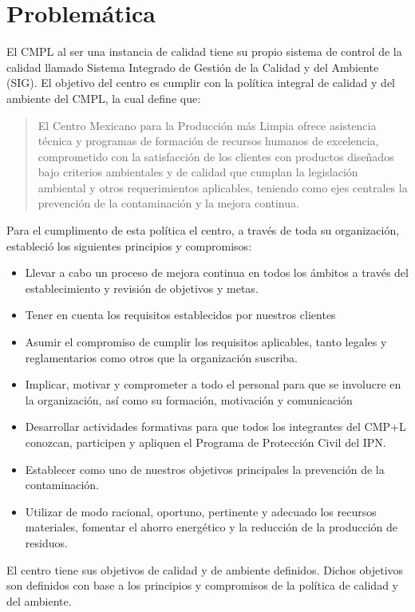 \section{Problemática}
El CMPL al ser una instancia de calidad tiene su propio sistema de control de la calidad llamado Sistema Integrado de Gestión de la Calidad y del Ambiente (SIG). El objetivo del centro es cumplir con la política integral de calidad y del ambiente del CMPL, la cual define que:

\begin{quote}
El Centro Mexicano para la Producción más Limpia ofrece asistencia técnica y programas de formación de recursos humanos de excelencia, comprometido con la satisfacción de los clientes con productos diseñados bajo criterios ambientales y de calidad  que cumplan la legislación ambiental y otros requerimientos  aplicables, teniendo como ejes centrales la prevención de la contaminación y la mejora continua.
\end{quote}

Para el cumplimento de esta política el centro, a través de toda su organización,  estableció los siguientes principios y compromisos:

\begin{itemize}
	\item	Llevar a cabo un proceso de mejora continua en todos los ámbitos a través del establecimiento y revisión de objetivos y metas.
	\item 	Tener en cuenta los requisitos establecidos por nuestros clientes
	\item 	Asumir el compromiso de cumplir los requisitos aplicables, tanto legales y reglamentarios como otros que la organización suscriba.
	\item 	Implicar, motivar y comprometer a todo el personal para que se involucre en la organización, así como su formación, motivación y comunicación
	\item 	Desarrollar actividades formativas para que todos los integrantes del CMP+L conozcan, participen y apliquen el Programa de Protección Civil del IPN.
	\item 	Establecer como uno de nuestros objetivos principales la prevención de la contaminación. 	\item Utilizar de modo racional, oportuno, pertinente y adecuado los recursos materiales, fomentar el ahorro energético y la reducción de la producción de residuos. 
\end{itemize}

El centro tiene sus objetivos de calidad y de ambiente definidos. Dichos objetivos son definidos con base a los principios y compromisos de la política de calidad y del ambiente.

